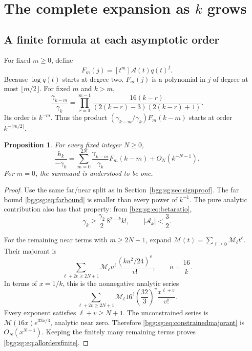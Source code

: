 \documentclass[11pt,a4paper]{article}
\numberwithin{equation}{section}
\newtheorem{proposition}[theorem]{Proposition}
\theoremstyle{definition}
\theoremstyle{remark}
\theoremstyle{definition}
\begin{document}
\section{The complete expansion as \texorpdfstring{\(k\)}{k} grows}\label{bgg:sg:sec:largeorderproof}

\subsection{A finite formula at each asymptotic order}

For fixed \(m\ge0\), define
\[
 F_m(j)=[t^m]\mathcal A(t)q(t)^j.
\]
Because \(\log q(t)\) starts at degree two, \(F_m(j)\) is a
polynomial in \(j\) of degree at most \(\lfloor m/2\rfloor\).
For fixed \(m\) and \(k>m\),
\begin{equation}\label{bgg:sg:eq:fixedmratio}
 \frac{\gamma_{k-m}}{\gamma_k}
 =\prod_{r=0}^{m-1}
       \frac{16(k-r)}{(2(k-r)-3)(2(k-r)+1)}.
\end{equation}
Its order is \(k^{-m}\).  Thus the product
\((\gamma_{k-m}/\gamma_k)F_m(k-m)\) starts at order
\(k^{-\lceil m/2\rceil}\).

\begin{proposition}\label{bgg:sg:prop:allorders}
For every fixed integer \(N\ge0\),
\begin{equation}\label{bgg:sg:eq:allordersfinite}
 \frac{h_k}{-\gamma_k}
 =\sum_{m=0}^{2N}
       \frac{\gamma_{k-m}}{\gamma_k}F_m(k-m)
       +O_N(k^{-N-1}).
\end{equation}
For \(m=0\), the summand is understood to be one.
\end{proposition}

\begin{proof}
Use the same far/near split as in
Section~\ref{bgg:sg:sec:signproof}.  The far bound
\eqref{bgg:sg:eq:farbound} is smaller than every power of \(k^{-1}\).
The pure analytic contribution also has that property: from
\eqref{bgg:sg:eq:betaratio},
\[
 \gamma_k\ge\frac{\gamma_2}{2}\,8^{2-k}k!,
 \qquad |\mathcal A_k|<\frac32.
\]

For the remaining near terms with \(m\ge2N+1\), expand
\(\mathcal M(t)=\sum_{\ell\ge0}\mathcal M_\ell t^\ell\).  Their majorant is
\[
 \sum_{\ell+2v\ge2N+1}
 \mathcal M_\ell u^\ell\frac{(ku^2/24)^v}{v!},
 \qquad u=\frac{16}{k}.
\]
In terms of \(x=1/k\), this is the nonnegative analytic series
\begin{equation}\label{bgg:sg:eq:constrainedmajorant}
 \sum_{\ell+2v\ge2N+1}
 \mathcal M_\ell16^\ell\left(\frac{32}{3}\right)^v
                  \frac{x^{\ell+v}}{v!}.
\end{equation}
Every exponent satisfies \(\ell+v\ge N+1\).
The unconstrained series is
\(\mathcal M(16x)e^{32x/3}\), analytic near zero.
Therefore \eqref{bgg:sg:eq:constrainedmajorant} is \(O_N(x^{N+1})\).
Keeping the finitely many remaining terms proves
\eqref{bgg:sg:eq:allordersfinite}.
\end{proof}
\end{document}
